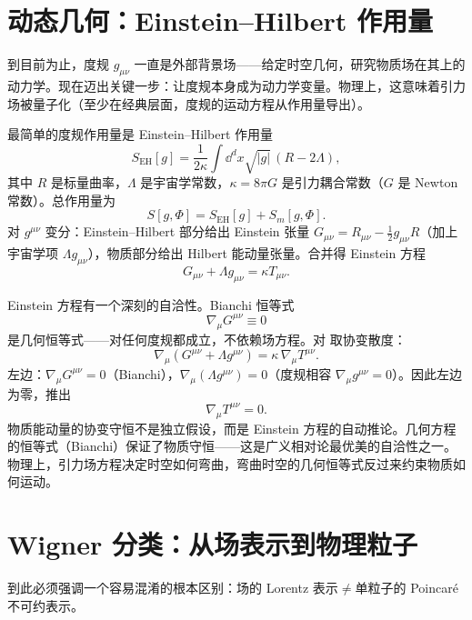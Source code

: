\section{动态几何：Einstein--Hilbert 作用量}

到目前为止，度规 $g_{\mu\nu}$ 一直是外部背景场——给定时空几何，研究物质场在其上的动力学。现在迈出关键一步：让度规本身成为动力学变量。物理上，这意味着引力场被量子化（至少在经典层面，度规的运动方程从作用量导出）。

最简单的度规作用量是 Einstein--Hilbert 作用量
\begin{equation*}S_{\text{EH}}[g]=\frac{1}{2\kappa}\int \dd^dx\sqrt{|g|}\,(R-2\Lambda),
\end{equation*}
其中 $R$ 是标量曲率，$\Lambda$ 是宇宙学常数，$\kappa=8\pi G$ 是引力耦合常数（$G$ 是 Newton 常数）。总作用量为
\begin{equation}
S[g,\Phi]=S_{\text{EH}}[g]+S_m[g,\Phi].
\end{equation}
对 $g^{\mu\nu}$ 变分：Einstein--Hilbert 部分给出 Einstein 张量 $G_{\mu\nu}=R_{\mu\nu}-\frac{1}{2}g_{\mu\nu}R$（加上宇宙学项 $\Lambda g_{\mu\nu}$），物质部分给出 Hilbert 能动量张量。合并得 Einstein 方程
\begin{equation}\label{eq:ms-curved-einstein}
\boxed{G_{\mu\nu}+\Lambda g_{\mu\nu}=\kappa T_{\mu\nu}.}
\end{equation}

Einstein 方程有一个深刻的自洽性。Bianchi 恒等式
\begin{equation}
\nabla_\mu G^{\mu\nu}\equiv 0
\end{equation}
是几何恒等式——对任何度规都成立，不依赖场方程。对 取协变散度：
\begin{equation*}
\nabla_\mu(G^{\mu\nu}+\Lambda g^{\mu\nu})=\kappa\,\nabla_\mu T^{\mu\nu}.
\end{equation*}
左边：$\nabla_\mu G^{\mu\nu}=0$（Bianchi），$\nabla_\mu(\Lambda g^{\mu\nu})=0$（度规相容 $\nabla_\mu g^{\mu\nu}=0$）。因此左边为零，推出
\begin{equation}
\nabla_\mu T^{\mu\nu}=0.
\end{equation}
物质能动量的协变守恒不是独立假设，而是 Einstein 方程的自动推论。几何方程的恒等式（Bianchi）保证了物质守恒——这是广义相对论最优美的自洽性之一。物理上，引力场方程决定时空如何弯曲，弯曲时空的几何恒等式反过来约束物质如何运动。

\section{Wigner 分类：从场表示到物理粒子}
到此必须强调一个容易混淆的根本区别：场的 Lorentz 表示$\neq$单粒子的 Poincaré 不可约表示。

